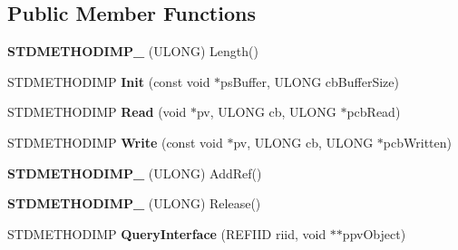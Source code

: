 \subsection*{Public Member Functions}
\begin{DoxyCompactItemize}
\item 
\mbox{\label{classnetwork_1_1CXHR2DataStream_abdadadd5c937d9b0853ddc9a8ab7ff14}} 
{\bfseries S\+T\+D\+M\+E\+T\+H\+O\+D\+I\+M\+P\+\_\+} (U\+L\+O\+NG) Length()
\item 
\mbox{\label{classnetwork_1_1CXHR2DataStream_a955631eb828f798d9612c9323e6ed8f2}} 
S\+T\+D\+M\+E\+T\+H\+O\+D\+I\+MP {\bfseries Init} (const void $\ast$ps\+Buffer, U\+L\+O\+NG cb\+Buffer\+Size)
\item 
\mbox{\label{classnetwork_1_1CXHR2DataStream_a6701edd1fc907329e1a728fb6fccce57}} 
S\+T\+D\+M\+E\+T\+H\+O\+D\+I\+MP {\bfseries Read} (void $\ast$pv, U\+L\+O\+NG cb, U\+L\+O\+NG $\ast$pcb\+Read)
\item 
\mbox{\label{classnetwork_1_1CXHR2DataStream_a2f61b3ec86c296da007c84394df00e0e}} 
S\+T\+D\+M\+E\+T\+H\+O\+D\+I\+MP {\bfseries Write} (const void $\ast$pv, U\+L\+O\+NG cb, U\+L\+O\+NG $\ast$pcb\+Written)
\item 
\mbox{\label{classnetwork_1_1CXHR2DataStream_a01b8b3a052d11cc91fbcdb01ca07ef43}} 
{\bfseries S\+T\+D\+M\+E\+T\+H\+O\+D\+I\+M\+P\+\_\+} (U\+L\+O\+NG) Add\+Ref()
\item 
\mbox{\label{classnetwork_1_1CXHR2DataStream_a2893dadeae5404c55500b76b481df53a}} 
{\bfseries S\+T\+D\+M\+E\+T\+H\+O\+D\+I\+M\+P\+\_\+} (U\+L\+O\+NG) Release()
\item 
\mbox{\label{classnetwork_1_1CXHR2DataStream_a10372d046f851ed1564788d893304f3a}} 
S\+T\+D\+M\+E\+T\+H\+O\+D\+I\+MP {\bfseries Query\+Interface} (R\+E\+F\+I\+ID riid, void $\ast$$\ast$ppv\+Object)
\item 
\mbox{\label{classnetwork_1_1CXHR2DataStream_af7a761d6339a481f2cc5234de6d45e1f}} 
$$
\end{DoxyCompactItemize}

